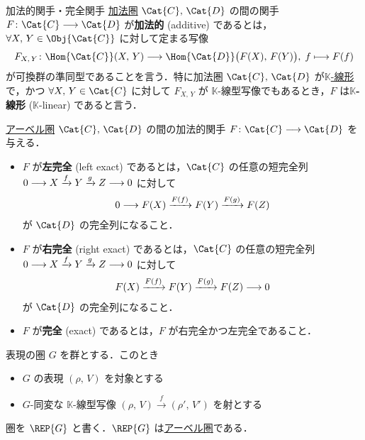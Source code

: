 \documentclass[TQFT_main]{subfiles}
\begin{document}
    \begin{mydef}[label=def:additive-exact]{加法的関手・完全関手}
        \hyperref[def:additive-cat]{加法圏} $\Cat{C},\, \Cat{D}$ の間の関手 $F \colon \Cat{C} \lto \Cat{D}$ が\textbf{加法的} (additive) であるとは，
        $\forall X,\, Y \in \Obj{\Cat{C}}$ に対して定まる写像
        \begin{align}
            F_{X,\, Y} \colon \Hom{\Cat{C}}(X,\, Y) \lto \Hom{\Cat{D}} \bigl( F(X),\, F(Y) \bigr),\; f \lmto F(f)
        \end{align}
        が可換群の準同型であることを言う．特に加法圏 $\Cat{C},\, \Cat{D}$ が\hyperref[def:additive-cat]{$\mathbb{K}$-線形}で，かつ $\forall X,\, Y \in \Cat{C}$ に対して $F_{X,\, Y}$ が $\mathbb{K}$-線型写像でもあるとき，$F$ は\textbf{$\mathbb{K}$-線形} ($\mathbb{K}$-linear) であると言う．

        \tcblower

        \hyperref[def:additive-cat]{アーベル圏} $\Cat{C},\, \Cat{D}$ の間の加法的関手 $F \colon \Cat{C} \lto \Cat{D}$ を与える．
        \begin{itemize}
            \item $F$ が\textbf{左完全} (left exact) であるとは，$\Cat{C}$ の任意の短完全列 $0 \longrightarrow X \xrightarrow{f} Y \xrightarrow{g} Z \longrightarrow 0$ に対して
            \begin{align}
                0 \longrightarrow F(X) \xrightarrow{F(f)} F(Y) \xrightarrow{F(g)} F(Z)
            \end{align}
            が $\Cat{D}$ の完全列になること．
            \item $F$ が\textbf{右完全} (right exact) であるとは，$\Cat{C}$ の任意の短完全列 $0 \longrightarrow X \xrightarrow{f} Y \xrightarrow{g} Z \longrightarrow 0$ に対して
            \begin{align}
                F(X) \xrightarrow{F(f)} F(Y) \xrightarrow{F(g)} F(Z) \longrightarrow 0
            \end{align}
            が $\Cat{D}$ の完全列になること．
            \item $F$ が\textbf{完全} (exact) であるとは，$F$ が右完全かつ左完全であること．
        \end{itemize}
        
    \end{mydef}


    \begin{myexample}[label=def:Rep]{表現の圏}
        $G$ を群とする．このとき
        \begin{itemize}
            \item $G$ の表現 $(\rho,\, V)$ を対象とする
            \item $G$-同変な $\mathbb{K}$-線型写像 $(\rho,\, V) \xrightarrow{f} (\rho',\, V')$ を射とする
        \end{itemize}
        圏を $\REP{G}$ と書く．$\REP{G}$ は\hyperref[def:additive-cat]{アーベル圏}である．
    \end{myexample}
\end{document}
